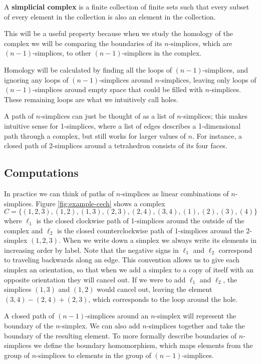 \begin{definition}\label{def:simplicial-complex}
    A \textbf{simplicial complex} is a finite collection of finite sets such that every subset of every element in the collection is also an element in the collection. \cite{wagner}
\end{definition}

This will be a useful property because when we study the homology of the complex we will be comparing the boundaries of its \(n\)-simplices, which are \((n-1)\)-simplices, to other \((n-1)\)-simplices in the complex.

Homology will be calculated by finding all the loops of \((n-1)\)-simplices, and ignoring any loops of \((n-1)\)-simplices around \(n\)-simplices, leaving only loops of \((n-1)\)-simplices around empty space that could be filled with \(n\)-simplices.
These remaining loops are what we intuitively call holes.

A path of \(n\)-simplices can just be thought of as a list of \(n\)-simplices; this makes intuitive sense for 1-simplices, where a list of edges describes a 1-dimensional path through a complex, but still works for larger values of \(n\).
For instance, a closed path of 2-simplices around a tetrahedron consists of its four faces.

\subsection{Computations}

In practice we can think of paths of \(n\)-simplices as linear combinations of \(n\)-simplices.
Figure \ref{fig:example-cech} shows a complex \(C = \{ (1,2,3), (1,2), (1,3), (2,3), (2,4), (3,4), (1), (2), (3), (4) \}\) where \(\ell_1\) is the closed clockwise path of 1-simplices around the outside of the complex and \(\ell_2\) is the closed counterclockwise path of 1-simplices around the 2-simplex \((1,2,3)\).
When we write down a simplex we always write its elements in increasing order by label.
Note that the negative signs in \(\ell_1\) and \(\ell_2\) correspond to traveling backwards along an edge.
This convention allows us to give each simplex an orientation, so that when we add a simplex to a copy of itself with an opposite orientation they will cancel out.
If we were to add \(\ell_1\) and \(\ell_2\), the simplices \((1, 3)\) and \((1, 2)\) would cancel out, leaving the element \((3, 4) - (2, 4) + (2, 3)\), which corresponds to the loop around the hole.

A closed path of \((n-1)\)-simplices around an \(n\)-simplex will represent the boundary of the \(n\)-simplex.
We can also add \(n\)-simplices together and take the boundary of the resulting element.
To more formally describe boundaries of \(n\)-simplices we define the boundary homomorphism, which maps elements from the group of \(n\)-simplices to elements in the group of \((n-1)\)-simplices.

